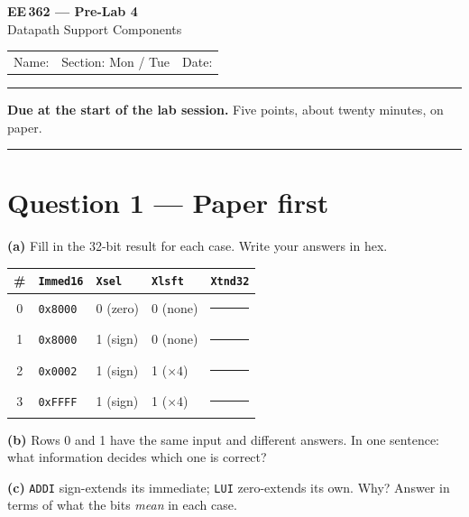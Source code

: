\documentclass[11pt]{article}
\newcommand{\code}[1]{\texttt{#1}}
\newcommand{\answerbox}[1]{\vspace{2pt}\fbox{\parbox[c][#1][c]{\dimexpr\linewidth-2\fboxsep-2\fboxrule}{\ }}\vspace{4pt}}
\begin{document}
\begin{center}
{\Large\bfseries EE\,362 --- Pre-Lab 4}\\[2pt]
{\large Datapath Support Components}\\[6pt]
\begin{tabular}{@{}p{6.5cm}p{4cm}p{4cm}@{}}
Name: \hrulefill & Section: Mon / Tue & Date: \hrulefill
\end{tabular}
\end{center}

\vspace{2pt}\hrule\vspace{4pt}

{\small\textbf{Due at the start of the lab session.} Five points, about twenty
minutes, on paper.}

\vspace{4pt}\hrule

\section*{Question 1 --- Paper first}

\textbf{(a)} Fill in the 32-bit result for each case. Write your answers in hex.

\begin{center}
\begin{tabular}{clll@{\hskip 8pt}||@{\hskip 8pt}l}
\toprule
\# & \code{Immed16} & \code{Xsel} & \code{Xlsft} & \code{Xtnd32} \\
\midrule
0 & \code{0x8000} & 0 (zero) & 0 (none) & \rule{4cm}{0.4pt} \\[5pt]
1 & \code{0x8000} & 1 (sign) & 0 (none) & \rule{4cm}{0.4pt} \\[5pt]
2 & \code{0x0002} & 1 (sign) & 1 ($\times4$) & \rule{4cm}{0.4pt} \\[5pt]
3 & \code{0xFFFF} & 1 (sign) & 1 ($\times4$) & \rule{4cm}{0.4pt} \\
\bottomrule
\end{tabular}
\end{center}

\textbf{(b)} Rows 0 and 1 have the same input and different answers. In one
sentence: what information decides which one is correct?

\answerbox{1.4cm}

\textbf{(c)} \code{ADDI} sign-extends its immediate; \code{LUI} zero-extends its
own. Why? Answer in terms of what the bits \emph{mean} in each case.

\answerbox{1.8cm}
\end{document}
